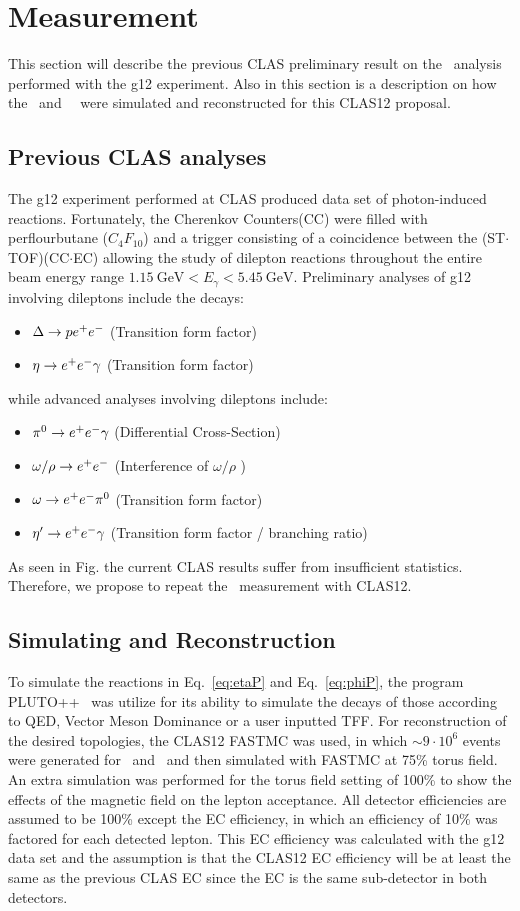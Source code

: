 \section{Measurement}\label{sec:measurement}
This section will describe the previous CLAS preliminary result on the \etaTP \ analysis performed with the g12 experiment. Also in this section is a description on how the \etaDal \ and \ \phiDal \ were simulated and reconstructed for this CLAS12 proposal.
\subsection{Previous CLAS analyses}
The g12 experiment performed at CLAS produced data set of photon-induced reactions. Fortunately, the Cherenkov Counters(CC) were filled with perflourbutane ($C_4F_{10}$) and a trigger consisting of a coincidence between the (ST$\cdot$TOF)(CC$\cdot$EC) allowing the study of dilepton reactions throughout the entire beam energy range $1.15 \ \mathrm{GeV}<E_\gamma <5.45 \ \mathrm{GeV}$. Preliminary analyses of g12 involving dileptons include the decays:
\begin{itemize}
\item $\Delta \to p e^+e^-$ (Transition form factor)
\item $\eta \to e^+e^- \gamma$ (Transition form factor)
\end{itemize}

while advanced analyses involving dileptons include:
\begin{itemize}
\item $\pi^{0} \to e^+e^- \gamma$ (Differential Cross-Section)
\item $\omega / \rho \to e^+e^-$ (Interference of $\omega/\rho$ )
\item $\omega \to e^+e^- \pi^{0}$ (Transition form factor)
\item $\eta^{\prime} \to e^+e^- \gamma$ (Transition form factor / branching ratio)
\end{itemize}
As seen in Fig. the current CLAS results suffer from insufficient statistics. Therefore, we propose to repeat the \etaPDal \  measurement with CLAS12.
\subsection{Simulating and Reconstruction}
To simulate the reactions in Eq.~\ref{eq:etaP} and Eq.~\ref{eq:phiP}, the program PLUTO++~\cite{PLUTO} was utilize for its ability to simulate the decays of those according to QED, Vector Meson Dominance or a user inputted TFF. For reconstruction of the desired topologies, the CLAS12 FASTMC was used, in which $\sim 9\cdot10^6$ events were generated for \etaPDal \ and \phiDal \ and then simulated with FASTMC at 75\% torus field. An extra simulation was performed for the torus field setting of 100\% to show the effects of the magnetic field on the lepton acceptance. All detector efficiencies are assumed to be 100\% except the EC efficiency, in which an efficiency of 10\% was factored for each detected lepton. This EC efficiency was calculated with the g12 data set and the assumption is that the CLAS12 EC efficiency will be at least the same as the previous CLAS EC since the EC is the same sub-detector in both detectors.

